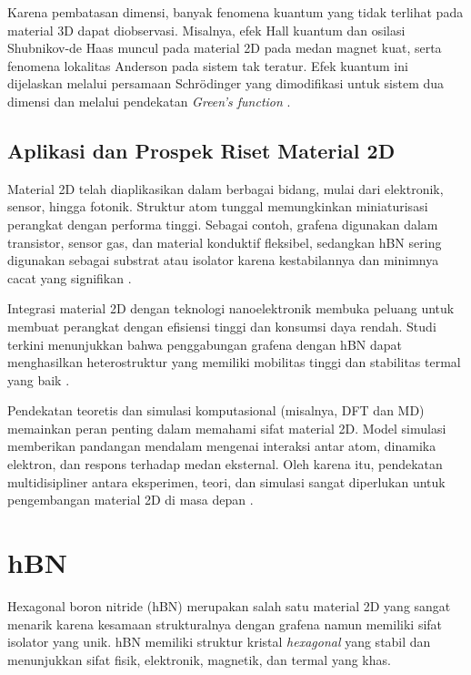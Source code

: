 Karena pembatasan dimensi, banyak fenomena kuantum yang tidak terlihat pada material 3D dapat diobservasi. Misalnya, efek Hall kuantum dan osilasi Shubnikov-de Haas muncul pada material 2D pada medan magnet kuat, serta fenomena lokalitas Anderson pada sistem tak teratur. Efek kuantum ini dijelaskan melalui persamaan Schrödinger yang dimodifikasi untuk sistem dua dimensi dan melalui pendekatan \emph{Green’s function} \citep{ando_dynamical_2002}.

\subsection{Aplikasi dan Prospek Riset Material 2D}
Material 2D telah diaplikasikan dalam berbagai bidang, mulai dari elektronik, sensor, hingga fotonik. Struktur atom tunggal memungkinkan miniaturisasi perangkat dengan performa tinggi. Sebagai contoh, grafena digunakan dalam transistor, sensor gas, dan material konduktif fleksibel, sedangkan hBN sering digunakan sebagai substrat atau isolator karena kestabilannya dan minimnya cacat yang signifikan \citep{geim_van_2013}.  
   
Integrasi material 2D dengan teknologi nanoelektronik membuka peluang untuk membuat perangkat dengan efisiensi tinggi dan konsumsi daya rendah. Studi terkini menunjukkan bahwa penggabungan grafena dengan hBN dapat menghasilkan heterostruktur yang memiliki mobilitas tinggi dan stabilitas termal yang baik \citep{zhang_electrical_2016}.

Pendekatan teoretis dan simulasi komputasional (misalnya, DFT dan MD) memainkan peran penting dalam memahami sifat material 2D. Model simulasi memberikan pandangan mendalam mengenai interaksi antar atom, dinamika elektron, dan respons terhadap medan eksternal. Oleh karena itu, pendekatan multidisipliner antara eksperimen, teori, dan simulasi sangat diperlukan untuk pengembangan material 2D di masa depan \citep{das_beyond_2015}.

\section{hBN}
Hexagonal boron nitride (hBN) merupakan salah satu material 2D yang sangat menarik karena kesamaan strukturalnya dengan grafena namun memiliki sifat isolator yang unik. hBN memiliki struktur kristal \emph{hexagonal} yang stabil dan menunjukkan sifat fisik, elektronik, magnetik, dan termal yang khas.

